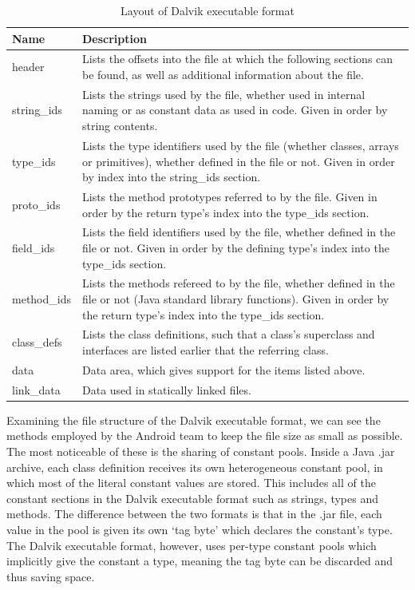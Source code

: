 \begin{center}
\begin{table}[htbp]
    \begin{tabular}{ | l | p{10cm} | } \hline
    Name 		& Description \\ \hline
    header		&	Lists the offsets into the file at which the following sections can be found, as well as additional information about the file. \\ \hline
	string\_ids	&	Lists the strings used by the file, whether used in internal naming or as constant data as used in code. Given in order by string contents. \\ \hline
	type\_ids	&	Lists the type identifiers used by the file (whether classes, arrays or primitives), whether defined in the file or not. Given in order by index into the string\_ids section. \\ \hline
	proto\_ids	&	Lists the method prototypes referred to by the file. Given in order by the return type's index into the type\_ids section. \\ \hline
	field\_ids	&	Lists the field identifiers used by the file, whether defined in the file or not. Given in order by the defining type's index into the type\_ids section. \\ \hline
	method\_ids	&	Lists the methods refereed to by the file, whether defined in the file or not (\ie Java standard library functions).
					Given in order by the return type's index into the type\_ids section. \\ \hline
	class\_defs	&	Lists the class definitions, such that a class's superclass and interfaces are listed earlier that the referring class. \\ \hline
	data		&	Data area, which gives support for the items listed above. \\ \hline
	link\_data	&	Data used in statically linked files. \\ \hline
    \end{tabular}
    
    \caption{Layout of Dalvik executable format}
    \label{tab:dalvik_layout}
\end{table}
\end{center}

Examining the file structure of the Dalvik executable format, we can see the methods employed by the Android team to keep the file size as small as possible. The most noticeable of these is the sharing of constant pools. Inside a Java .jar archive, each class definition receives its own heterogeneous constant pool, in which most of the literal constant values are stored. This includes all of the constant sections in the Dalvik executable format such as strings, types and methods. The difference between the two formats is that in the .jar file, each value in the pool is given its own `tag byte' which declares the constant's type. The Dalvik executable format, however, uses per-type constant pools which implicitly give the constant a type, meaning the tag byte can be discarded and thus saving space.

